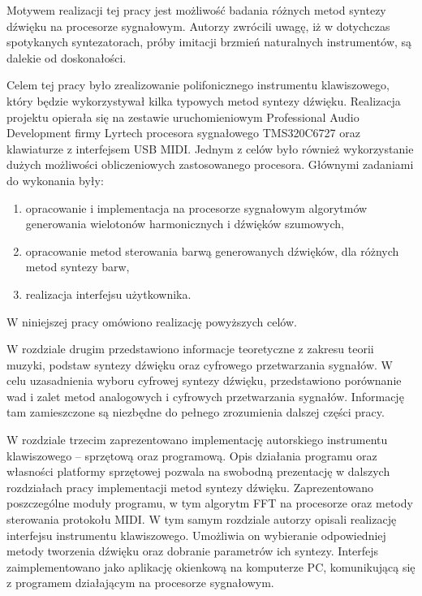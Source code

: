 Motywem realizacji tej pracy jest możliwość badania różnych metod syntezy dźwięku na procesorze sygnałowym. 
Autorzy zwrócili uwagę, iż w dotychczas spotykanych syntezatorach, próby imitacji brzmień naturalnych instrumentów, są dalekie od doskonałości.

Celem tej pracy było zrealizowanie polifonicznego instrumentu klawiszowego, który będzie wykorzystywał kilka typowych metod syntezy dźwięku. Realizacja projektu opierała się na zestawie uruchomieniowym Professional Audio Development firmy Lyrtech procesora sygnałowego TMS320C6727 oraz klawiaturze z interfejsem USB MIDI. Jednym z celów było również wykorzystanie dużych możliwości obliczeniowych zastosowanego procesora. Głównymi zadaniami do wykonania były:

\begin{enumerate}
    \item opracowanie i implementacja na procesorze sygnałowym algorytmów generowania wielotonów harmonicznych i dźwięków szumowych,
    
    \item opracowanie metod sterowania barwą generowanych dźwięków, dla różnych metod syntezy barw,
    
    \item realizacja interfejsu użytkownika.
\end{enumerate}
W niniejszej pracy omówiono realizację powyższych celów.

W rozdziale drugim przedstawiono informacje teoretyczne z zakresu teorii muzyki, podstaw syntezy dźwięku oraz cyfrowego przetwarzania sygnałów. W celu uzasadnienia wyboru cyfrowej syntezy dźwięku, przedstawiono porównanie wad i zalet metod analogowych i cyfrowych przetwarzania sygnałów. Informację tam zamieszczone są niezbędne do pełnego zrozumienia dalszej części pracy.

W rozdziale trzecim zaprezentowano implementację autorskiego instrumentu klawiszowego – sprzętową oraz programową. Opis działania programu oraz własności platformy sprzętowej pozwala na swobodną prezentację w dalszych rozdziałach pracy implementacji metod syntezy dźwięku. Zaprezentowano poszczególne moduły programu, w tym algorytm FFT na procesorze oraz metody sterowania protokołu MIDI. W tym samym rozdziale autorzy opisali realizację interfejsu instrumentu klawiszowego. Umożliwia on wybieranie odpowiedniej metody tworzenia dźwięku oraz dobranie parametrów ich syntezy. Interfejs zaimplementowano jako aplikację okienkową na komputerze PC, komunikującą się z programem działającym na procesorze sygnałowym.

